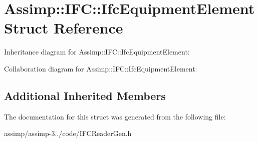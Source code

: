 \hypertarget{struct_assimp_1_1_i_f_c_1_1_ifc_equipment_element}{\section{Assimp\+:\+:I\+F\+C\+:\+:Ifc\+Equipment\+Element Struct Reference}
\label{struct_assimp_1_1_i_f_c_1_1_ifc_equipment_element}
}


Inheritance diagram for Assimp\+:\+:I\+F\+C\+:\+:Ifc\+Equipment\+Element\+:


Collaboration diagram for Assimp\+:\+:I\+F\+C\+:\+:Ifc\+Equipment\+Element\+:
\subsection*{Additional Inherited Members}


The documentation for this struct was generated from the following file\+:\begin{DoxyCompactItemize}
\item 
assimp/assimp-\/3../code/I\+F\+C\+Reader\+Gen.\+h\end{DoxyCompactItemize}
